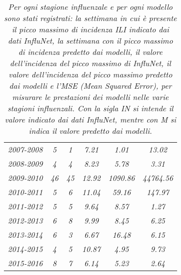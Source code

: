 \begin{table}[p]
\begin{adjustbox}{max width=\textwidth}
\begin{tabular}{|c|c|c|c|c|c|}
\rowcolor[HTML]{EFEFEF} 
\multicolumn{6}{|c|}{\cellcolor[HTML]{EFEFEF}Modello di Poisson} \\ \hline
\textit{2007-2008}            & \textit{5}                          & \textit{1}                    & \textit{7.21}           & \textit{1.01}     & \textit{13.02}    \\ \hline
\rowcolor[HTML]{FFFFFF} 
\textit{2008-2009}            & \textit{4}                          & \textit{4}                    & \textit{8.23}           & \textit{5.78}     & \textit{3.31}     \\ \hline
\rowcolor[HTML]{FFFFFF} 
\textit{2009-2010}            & \textit{46}                         & \textit{45}                   & \textit{12.92}          & \textit{1090.86}  & \textit{44764.56} \\ \hline
\rowcolor[HTML]{FFFFFF} 
\textit{2010-2011}            & \textit{5}                          & \textit{6}                    & \textit{11.04}          & \textit{59.16}    & \textit{147.97}   \\ \hline
\rowcolor[HTML]{FFFFFF} 
\textit{2011-2012}            & \textit{5}                          & \textit{5}                    & \textit{9.64}           & \textit{8.57}     & \textit{1.27}     \\ \hline
\rowcolor[HTML]{FFFFFF} 
\textit{2012-2013}            & \textit{6}                          & \textit{8}                    & \textit{9.99}           & \textit{8.45}     & \textit{6.25}     \\ \hline
\rowcolor[HTML]{FFFFFF} 
\textit{2013-2014}            & \textit{6}                          & \textit{3}                    & \textit{6.67}           & \textit{16.48}    & \textit{6.15}     \\ \hline
\rowcolor[HTML]{FFFFFF} 
\textit{2014-2015}            & \textit{4}                          & \textit{5}                    & \textit{10.87}          & \textit{4.95}     & \textit{9.73}     \\ \hline
\rowcolor[HTML]{FFFFFF} 
\textit{2015-2016}            & \textit{8}                          & \textit{7}                    & \textit{6.14}           & \textit{5.23}     & \textit{2.64}     \\ \hline
\end{tabular}
\end{adjustbox}
\caption{\textit{Per ogni stagione influenzale e per ogni modello sono stati registrati: la settimana in cui è presente il 
picco massimo di incidenza ILI indicato dai dati InfluNet, la settimana con il picco massimo di incidenza predetto dai 
modelli, il valore dell'incidenza del picco massimo di InfluNet, il valore dell'incidenza del picco massimo predetto dai modelli e l'MSE (Mean Squared Error), per misurare le prestazioni dei modelli nelle varie stagioni influenzali. Con la sigla IN si intende il valore indicato dai dati InfluNet, mentre con M si indica il valore predetto dai modelli.}}
\label{tab:models_results}
\end{table}

